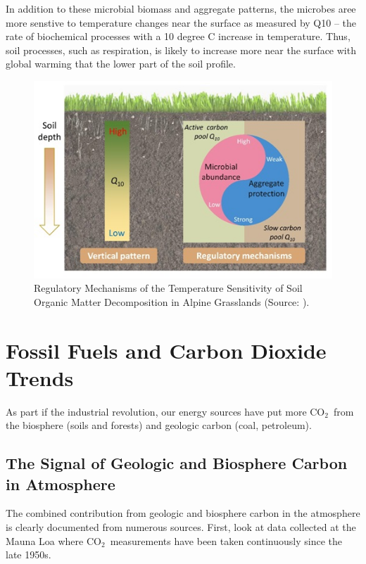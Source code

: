 \documentclass{book}\usepackage{knitr}
\newcommand{\carbondioxide}{CO$_2$~}
\begin{document}
In addition to these microbial biomass and aggregate patterns, the microbes aree more senstive to temperature changes near the surface as measured by Q10 -- the rate of biochemical processes with a 10 degree C increase in temperature. Thus, soil processes, such as respiration, is likely to increase more near the surface with global warming that the lower part of the soil profile.  

\begin{figure}
\includegraphics[width=\linewidth]{images/earth-system/Q10-SOC-Regulation.jpg}
\caption{Regulatory Mechanisms of the Temperature Sensitivity of Soil Organic Matter Decomposition in Alpine Grasslands (Source: \citet{Qineaau1218, CAS2021researchers}).}
\label{fig:Q10-SOC}
\end{figure}


\section{Fossil Fuels and Carbon Dioxide Trends}\label{sec:fossilfuels}

As part if the industrial revolution, our energy sources have put more \carbondioxide from the biosphere (soils and forests) and geologic carbon (coal, petroleum). 

\subsection{The Signal of Geologic and Biosphere Carbon in Atmosphere}

The combined contribution from geologic and biosphere carbon in the atmosphere is clearly documented from numerous sources. First, look at data collected at the Mauna Loa where \carbondioxide measurements have been taken continuously since the late 1950s. 
\end{document}

